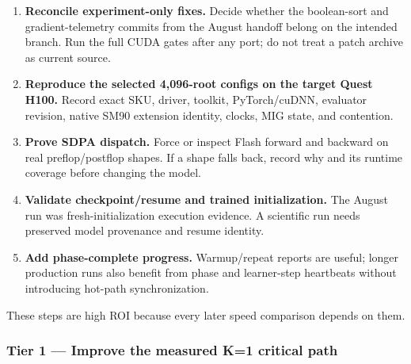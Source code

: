 \documentclass[
  10pt,
  letterpaper,
]{article}
\providecommand{\tightlist}{%
  \setlength{\itemsep}{0pt}\setlength{\parskip}{0pt}}
\begin{document}
\begin{enumerate}
\def\labelenumi{\arabic{enumi}.}
\tightlist
\item
  \textbf{Reconcile experiment-only fixes.} Decide whether the
  boolean-sort and gradient-telemetry commits from the August handoff
  belong on the intended branch. Run the full CUDA gates after any port;
  do not treat a patch archive as current source.
\item
  \textbf{Reproduce the selected 4,096-root configs on the target Quest
  H100.} Record exact SKU, driver, toolkit, PyTorch/cuDNN, evaluator
  revision, native SM90 extension identity, clocks, MIG state, and
  contention.
\item
  \textbf{Prove SDPA dispatch.} Force or inspect Flash forward and
  backward on real preflop/postflop shapes. If a shape falls back,
  record why and its runtime coverage before changing the model.
\item
  \textbf{Validate checkpoint/resume and trained initialization.} The
  August run was fresh-initialization execution evidence. A scientific
  run needs preserved model provenance and resume identity.
\item
  \textbf{Add phase-complete progress.} Warmup/repeat reports are
  useful; longer production runs also benefit from phase and
  learner-step heartbeats without introducing hot-path synchronization.
\end{enumerate}

These steps are high ROI because every later speed comparison depends on
them.

\subsubsection{Tier 1 --- Improve the measured K=1 critical
path}\label{tier-1--improve-the-measured-k1-critical-path}
\end{document}
